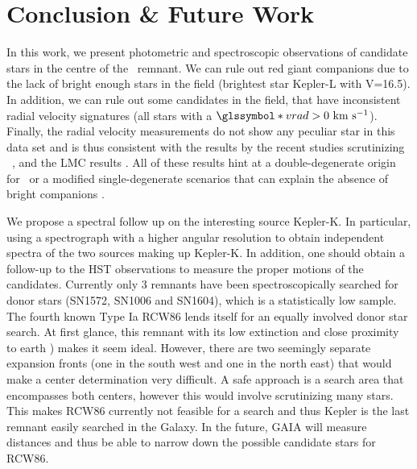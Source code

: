 \documentclass[preprint2]{aastex}
\begin{document}


%


\section{Conclusion \& Future Work}

\label{sec:conclusion}

In this work, we present photometric and spectroscopic observations of candidate stars in the centre of the \ remnant. We can rule out red giant companions due to the lack of bright enough stars in the field (brightest star Kepler-L with V=16.5). In addition, we can rule out some candidates in the field, that have inconsistent radial velocity signatures (all stars with a $\vrad>0~\kms$). Finally, the radial velocity measurements do not show any peculiar star in this data set and is thus consistent with the results by the recent studies scrutinizing \ \citep{2012Natur.489..533G,2012ApJ...759....7K}, and the LMC results \citep{2012ApJ...747L..19E, 2012Natur.481..164S}. All of these results hint at a double-degenerate origin \citep[including scenarios that explain circumstellar interaction; van Kerkwijk priv. comm., ][]{2011MNRAS.417.1466K} for \sneia\ or a modified single-degenerate scenarios that can explain the absence of bright companions \citep[e.g. evolving the companion to a white dwarf before the \snia\ event; ][]{2011ApJ...730L..34J,2011ApJ...738L...1D,2012ApJ...744...69H,2012ApJ...756L...4H,2012ApJ...758..123W}. 

We propose a spectral follow up on the interesting source Kepler-K. In particular, using a spectrograph with a higher angular resolution to obtain independent spectra of the two sources making up Kepler-K. In addition, one should obtain a follow-up to the HST observations to measure the proper motions of the candidates. Currently only 3 remnants have been spectroscopically searched for donor stars (SN1572, SN1006 and SN1604), which is a statistically low sample. The fourth known Type Ia \snr RCW86 lends itself for an equally involved donor star search. At first glance, this remnant with its low extinction \citep[$A_V \approx 1.7$;][]{1983MNRAS.204..273L} and close proximity to earth \citep[$d=2.5~\kpc$; ][]{2011ApJ...741...96W})  makes it seem ideal. However, there are two seemingly separate expansion fronts (one in the south west and one in the north east) that would make a center determination very difficult. A safe approach is a search area that encompasses both centers, however this would involve scrutinizing many stars. This makes RCW86 currently not feasible for a search and thus Kepler is the last remnant easily searched in the Galaxy. In the future, GAIA will measure distances and thus be able to narrow down the possible candidate stars for RCW86.
\end{document}
